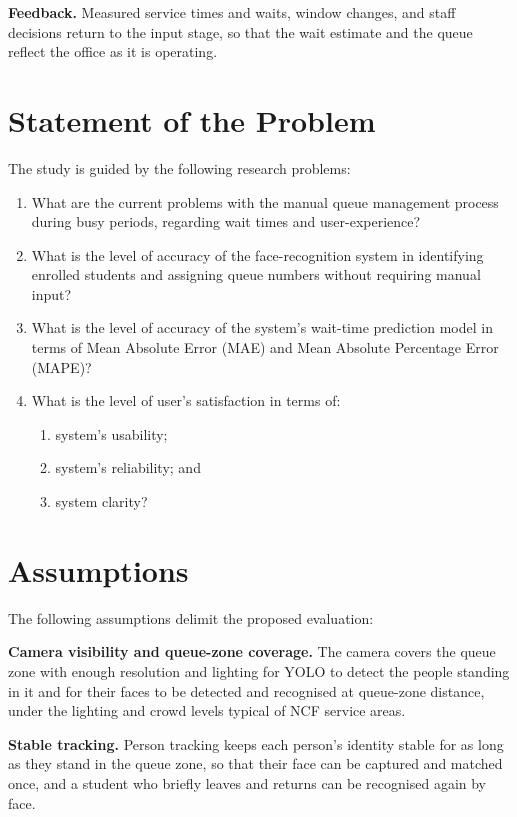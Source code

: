 \documentclass{research}
\begin{document}
\textbf{Feedback.} Measured service times and waits, window changes, and
staff decisions return to the input stage, so that the wait estimate and
the queue reflect the office as it is operating.

\section{Statement of the Problem}
\label{cr:sop}

The study is guided by the following research problems:
\begin{enumerate}
  \item What are the current problems with the manual queue management
        process during busy periods, regarding wait times and
        user-experience?
  \item What is the level of accuracy of the face-recognition system
        in identifying enrolled students and assigning queue numbers
        without requiring manual input?
  \item What is the level of accuracy of the system's wait-time
        prediction model in terms of Mean Absolute Error (MAE) and
        Mean Absolute Percentage Error (MAPE)?
  \item What is the level of user's satisfaction in terms of:
        \begin{enumerate}
          \item[(a)] system's usability;
          \item[(b)] system's reliability; and
          \item[(c)] system clarity?
        \end{enumerate}
\end{enumerate}

\section{Assumptions}
\label{cr:assumptions}

The following assumptions delimit the proposed evaluation:

\textbf{Camera visibility and queue-zone coverage.} The camera covers the
queue zone with enough resolution and lighting for YOLO to detect the
people standing in it and for their faces to be detected and recognised
at queue-zone distance, under the lighting and crowd levels typical of
NCF service areas.

\textbf{Stable tracking.} Person tracking keeps each person's identity
stable for as long as they stand in the queue zone, so that their face
can be captured and matched once, and a student who briefly leaves and
returns can be recognised again by face.
\end{document}
